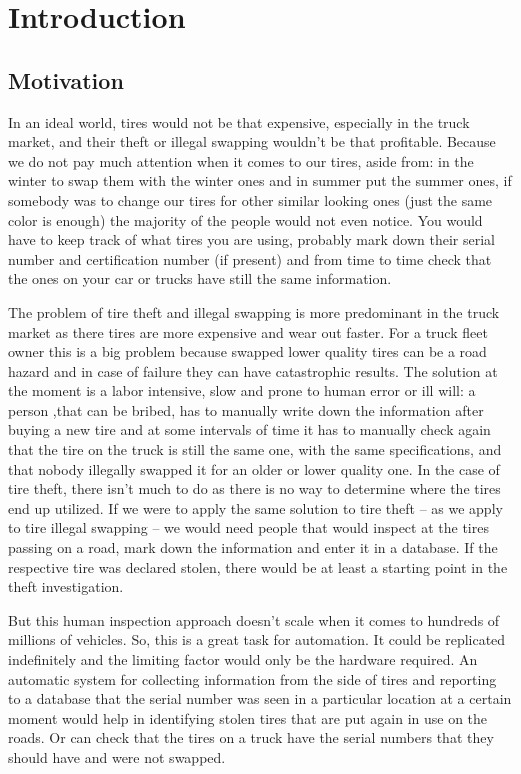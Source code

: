 \chapter{Introduction}\pagestyle{fancy}\setlength{\parindent}{3em}
\label{chap:intro}

\section{Motivation}

In an ideal world, tires would not be that expensive, especially in the truck market, and their theft or illegal swapping wouldn't be that profitable. Because we do not pay much attention when it comes to our tires, aside from: in the winter to swap them with the winter ones and in summer put the summer ones, if somebody was to change our tires for other similar looking ones (just the same color is enough) the majority of the people would not even notice. You would have to keep track of what tires you are using, probably mark down their serial number and certification number (if present) and from time to time check that the ones on your car or trucks have still the same information.

The problem of tire theft and illegal swapping is more predominant in the truck market as there tires are more expensive and wear out faster. For a truck fleet owner this is a big problem because swapped lower quality tires can be a road hazard and in case of failure they can have catastrophic results. The solution at the moment is a labor intensive, slow and prone to human error or ill will: a person ,that can be bribed, has to manually write down the information after buying a new tire and at some intervals of time it has to manually check again that the tire on the truck is still the same one, with the same specifications, and that nobody illegally swapped it for an older or lower quality one. In the case of tire theft, there isn't much to do as there is no way to determine where the tires end up utilized. If we were to apply the same solution to tire theft -- as we apply to tire illegal swapping -- we would need people that would inspect at the tires passing on a road, mark down the information and enter it in a database. If the respective tire was declared stolen, there would be at least a starting point in the theft investigation.

But this human inspection approach doesn't scale when it comes to hundreds of millions of vehicles. So, this is a great task for automation. It could be replicated indefinitely and the limiting factor would only be the hardware required. An automatic system for collecting information from the side of tires and reporting to a database that the serial number was seen in a particular location at a certain moment would help in identifying stolen tires that are put again in use on the roads. Or can check that the tires on a truck have the serial numbers that they should have and were not swapped.

